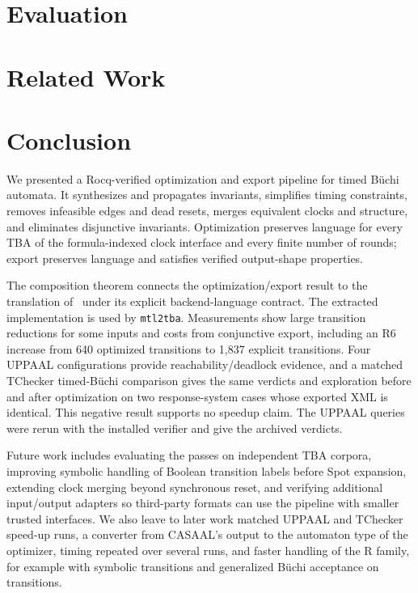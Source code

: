 \documentclass{ieeeaccess}
\begin{document}
\section{Evaluation}
\label{sec:evaluation}

\section{Related Work}
\label{sec:related}

\section{Conclusion}
\label{sec:conclusion}
We presented a Rocq-verified optimization and export pipeline for timed
B\"uchi automata. It synthesizes and propagates invariants, simplifies timing
constraints, removes infeasible edges and dead resets, merges equivalent
clocks and structure, and eliminates disjunctive invariants. Optimization
preserves language for every TBA of the formula-indexed clock interface and every finite number of rounds;
export preserves language and satisfies verified output-shape properties.

The composition theorem connects the optimization/export result to the
translation of~\cite{fares_bodeveix_mtl_translation} under its explicit backend-language contract. The
extracted implementation is used by \texttt{mtl2tba}. Measurements show
large transition reductions for some inputs and costs from conjunctive
export, including an R6 increase from 640 optimized transitions to 1,837
explicit transitions. Four UPPAAL configurations provide
reachability/deadlock evidence, and a matched TChecker timed-B\"uchi
comparison gives the same verdicts and exploration before and after
optimization on two response-system cases whose exported XML is identical.
This negative result supports no speedup claim. The UPPAAL queries were rerun
with the installed verifier and give the archived verdicts.

Future work includes evaluating the passes on independent TBA corpora, improving symbolic handling of Boolean transition labels before Spot expansion, extending clock merging beyond synchronous reset, and verifying additional input/output adapters so third-party formats can use the pipeline with smaller trusted interfaces. We also leave to later work matched UPPAAL and TChecker speed-up runs, a converter from CASAAL's output to the automaton type of the optimizer, timing repeated over several runs, and faster handling of the R family, for example with symbolic transitions and generalized B\"uchi acceptance on transitions.
\end{document}
